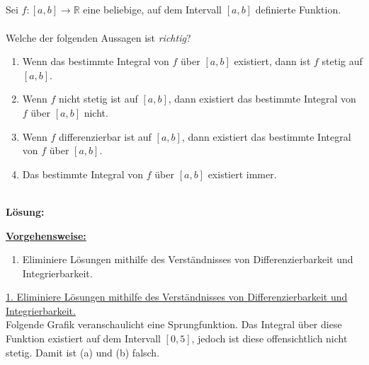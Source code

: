 \subsection*{}
Sei $ f : [a,b] \to \mathbb{R} $ eine beliebige, auf dem Intervall $ [a,b] $ definierte Funktion.\\
\\
Welche der folgenden Aussagen ist \textit{richtig}?
\renewcommand{\labelenumi}{(\alph{enumi})}
\begin{enumerate}
	\item 
	Wenn das bestimmte Integral von $ f $ über $ [a,b] $ existiert, dann ist $ f $ stetig auf $ [a,b] $.
	\item 
	Wenn $ f $ nicht stetig ist auf $ [a,b] $, dann existiert das bestimmte Integral von $ f $ über $ [a,b] $ nicht.
	\item 
	Wenn $ f $ differenzierbar ist auf $ [a,b] $, dann existiert das bestimmte Integral von $ f $ über $ [a,b] $.
	\item
	Das bestimmte Integral von $ f $ über $ [a,b]$ existiert immer.
\end{enumerate}
\ \\
\textbf{Lösung:}
\begin{mdframed}
\underline{\textbf{Vorgehensweise:}}
\renewcommand{\labelenumi}{\theenumi.}
\begin{enumerate}
\item Eliminiere Lösungen mithilfe des Verständnisses von Differenzierbarkeit und Integrierbarkeit.
\end{enumerate}
\end{mdframed}

\underline{1. Eliminiere Lösungen mithilfe des Verständnisses von Differenzierbarkeit und Integrierbarkeit.}\\
Folgende Grafik veranschaulicht eine Sprungfunktion.
Das Integral über diese Funktion existiert auf dem Intervall $ [0,5] $, jedoch ist diese offensichtlich nicht stetig.
Damit ist (a) und (b) falsch.
\begin{center}
\end{center}

